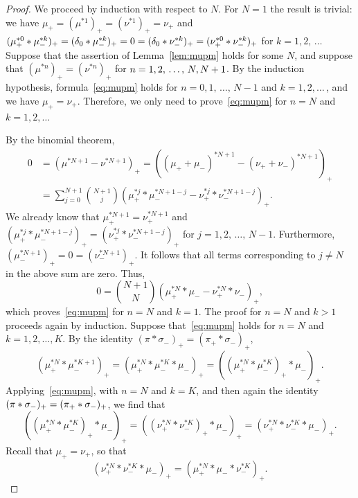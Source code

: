 \begin{proof}
We proceed by induction with respect to $N$. For $N = 1$ the result is trivial: we have $\mu_+ = (\mu^{*1})_+ = (\nu^{*1})_+ = \nu_+$ and $(\mu_+^{*0} * \mu_-^{*k})_+ = (\delta_0 * \mu_-^{*k})_+ = 0\linebreak= (\delta_0 * \nu_-^{*k})_+ = (\nu_+^{*0} * \nu_-^{*k})_+$ for $k = 1, 2,\,\ldots\,$ Suppose that the assertion of Lemma~\ref{lem:mupm} holds for some $N$, and suppose that $(\mu^{*n})_+ = (\nu^{*n})_+$ for $n = 1, 2,\,\ldots,\,N,\linebreak N + 1$. By the induction hypothesis, formula~\eqref{eq:mupm} holds for $n = 0, 1,\,\ldots,\,N - 1$ and $k = 1, 2, \ldots\,$, and we have $\mu_+ = \nu_+$. Therefore, we only need to prove~\eqref{eq:mupm} for $n = N$ and $k = 1, 2, \ldots$

By the binomial theorem,
\begin{align*}
0 & = \left(\mu^{*N + 1} - \nu^{*N + 1}\right)_+ = \left((\mu_+ + \mu_-)^{*N + 1} - (\nu_+ + \nu_-)^{*N + 1}\right)_+ \\
& = \sum_{j = 0}^{N + 1} \binom{N + 1}{j} \left(\mu_+^{*j} * \mu_-^{*N + 1 - j} - \nu_+^{*j} * \nu_-^{*N + 1 - j}\right)_+. 
\end{align*} 
We already know that $\mu_+^{*N + 1} = \nu_+^{*N + 1}$ and $(\mu_+^{*j} * \mu_-^{*N + 1 - j})_+ = (\nu_+^{*j} * \nu_-^{*N + 1 - j})_+$ for $j = 1, 2,\,\ldots,\,N - 1$. Furthermore, $(\mu_-^{*N + 1})_+ = 0 = (\nu_-^{*N + 1})_+$. It follows that all terms corresponding to $j \ne N$ in the above sum are zero. Thus,
\[
0 = \binom{N + 1}{N} \left(\mu_+^{*N} * \mu_- - \nu_+^{*N} * \nu_-\right)_+,
\]
which proves~\eqref{eq:mupm} for $n = N$ and $k = 1$. The proof for $n = N$ and $k > 1$ proceeds again by induction. Suppose that~\eqref{eq:mupm} holds for $n = N$ and $k = 1, 2, \ldots, K$. By the identity $(\pi * \sigma_-)_+ = (\pi_+ * \sigma_-)_+$,
\[
\left(\mu_+^{*N} * \mu_-^{*K + 1}\right)_+ = \left(\mu_+^{*N} * \mu_-^{*K} * \mu_-\right)_+ = \left(\left(\mu_+^{*N} * \mu_-^{*K}\right)_+ * \mu_-\right)_+.
\]
Applying~\eqref{eq:mupm}, with $n = N$ and $k = K$, and then again the identity $(\pi * \sigma_-)_+\linebreak= (\pi_+ * \sigma_-)_+$, we find that
\[
\left(\left(\mu_+^{*N} * \mu_-^{*K}\right)_+ * \mu_-\right)_+ = \left(\left(\nu_+^{*N} * \nu_-^{*K}\right)_+ * \mu_-\right)_+ = \left(\nu_+^{*N} * \nu_-^{*K} * \mu_-\right)_+.
\]
Recall that $\mu_+ = \nu_+$, so that
\[
\left(\nu_+^{*N} * \nu_-^{*K} * \mu_-\right)_+ = \left(\mu_+^{*N} * \mu_- * \nu_-^{*K}\right)_+.
\]
\end{proof}
